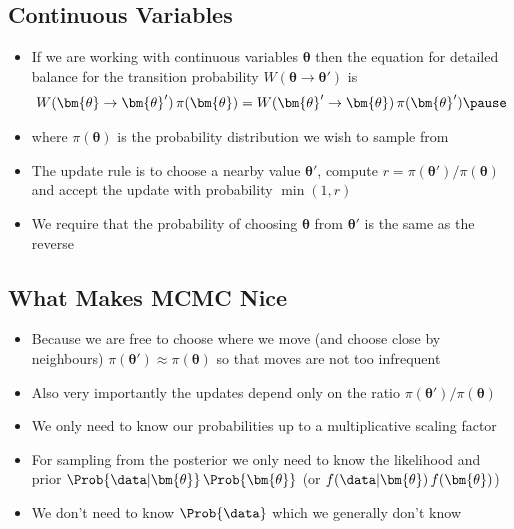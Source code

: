 \begin{slide}
\section{Continuous Variables}

\begin{PauseHighLight}
  \begin{itemize}
  \item If we are working with continuous variables $\bm{\theta}$ then
    the equation for detailed balance for the transition probability
    $W(\bm{\theta}\rightarrow \bm{\theta}')$ is
    \begin{align*}
      W(\bm{\theta}\rightarrow \bm{\theta}')\, \pi(\bm{\theta}) =
      W(\bm{\theta}'\rightarrow \bm{\theta})\, \pi(\bm{\theta}') \pause
    \end{align*}
  \item where $\pi(\bm{\theta})$ is the probability distribution we wish
    to sample from\pause
  \item The update rule is to choose a nearby value $\bm{\theta}'$,
    compute $r = \pi(\bm{\theta}')/\pi(\bm{\theta})$ and accept the
    update with probability $\min(1,r)$\pause
  \item We require that the probability of choosing $\bm{\theta}$ from
    $\bm{\theta}'$ is the same as the reverse\pause
  \end{itemize}
\end{PauseHighLight}

\end{slide}



\begin{slide}
\section{What Makes MCMC Nice}

\begin{PauseHighLight}
  \begin{itemize}
  \item Because we are free to choose where we move (and choose close
    by neighbours) $\pi(\bm{\theta}') \approx \pi(\bm{\theta})$ so that moves are not too
    infrequent\pause
  \item Also very importantly the updates depend only on the ratio
    $\pi(\bm{\theta}')/\pi(\bm{\theta})$\pause
  \item We only need to know our probabilities up to a multiplicative
    scaling factor\pause
  \item For sampling from the posterior we only need to know the
    likelihood and prior $\Prob{\data| \bm{\theta}}\,\Prob{\bm{\theta}}$\pause{}
    (or $f(\data| \bm{\theta})\,f(\bm{\theta})$)\pauseb
  \item We don't need to know $\Prob{\data}$ which we generally don't
    know\pause
  \end{itemize}
\end{PauseHighLight}

\end{slide}

